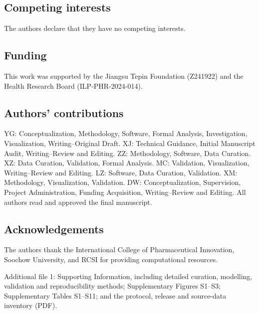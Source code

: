 \documentclass[referee,lineno,pdflatex,Numbered,sn-basic]{sn-jnl}
\begin{document}
\subsection*{Competing interests}
The authors declare that they have no competing interests.

\subsection*{Funding}
This work was supported by the Jiangsu Tepin Foundation (Z241922) and the Health Research Board (ILP-PHR-2024-014).

\subsection*{Authors' contributions}
YG: Conceptualization, Methodology, Software, Formal Analysis, Investigation, Visualization, Writing--Original Draft. XJ: Technical Guidance, Initial Manuscript Audit, Writing--Review and Editing. ZZ: Methodology, Software, Data Curation. XZ: Data Curation, Validation, Formal Analysis. MC: Validation, Visualization, Writing--Review and Editing. LZ: Software, Data Curation, Validation. XM: Methodology, Visualization, Validation. DW: Conceptualization, Supervision, Project Administration, Funding Acquisition, Writing--Review and Editing. All authors read and approved the final manuscript.

\subsection*{Acknowledgements}
The authors thank the International College of Pharmaceutical Innovation, Soochow University, and RCSI for providing computational resources.

Additional file 1: Supporting Information, including detailed curation, modelling, validation and reproducibility methods; Supplementary Figures S1--S3; Supplementary Tables S1--S11; and the protocol, release and source-data inventory (PDF).


\end{document}

